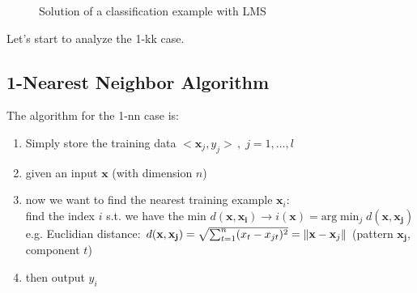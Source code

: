 \documentclass[../main.tex]{subfiles}
\begin{document}
\begin{figure}[H]
  \centering
  \hfill
  \caption{Solution of a classification example with LMS}
\end{figure}

\noindent Let's start to analyze the 1-kk case.\\

\subsection{1-Nearest Neighbor Algorithm}
The algorithm for the 1-nn case is:
\begin{enumerate}
    \item Simply store the training data $<\mathbf{x}_j , y_j>\, ,\; j = 1, \dots, l$
    \item given an input $\mathbf{x}$ (with dimension $n$)
    \item now we want to find the nearest training example $\mathbf{x}_i$:\\
            find the index $i$ s.t. we have the min $d(\mathbf{x},\mathbf{x_i}) \rightarrow i(\mathbf{x}) = \mbox{arg}\min_{j} d(\mathbf{x},\mathbf{x_j})$\\
            
            e.g.  Euclidian distance: $d(\mathbf{x},\mathbf{x_j}) = \sqrt{\sum_{t = 1}^n (x_t - x_{jt})^2} = \left\lVert\mathbf{x} - \mathbf{x}_j\right\rVert $ (pattern $\mathbf{x_j}$, component $t$) 
    \item then output $y_i$
\end{enumerate}
\end{document}
